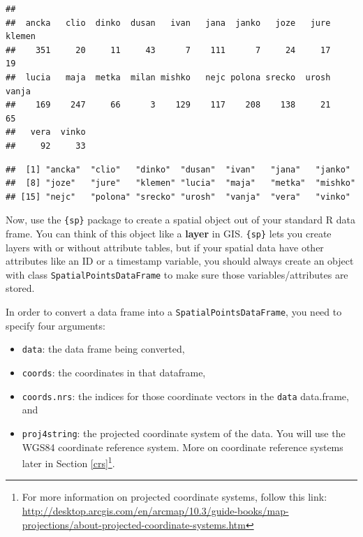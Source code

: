 \documentclass[]{book}
\newenvironment{Shaded}{\begin{snugshade}}{\end{snugshade}}
\newcommand{\KeywordTok}[1]{\textcolor[rgb]{0.13,0.29,0.53}{\textbf{#1}}}
\newcommand{\DecValTok}[1]{\textcolor[rgb]{0.00,0.00,0.81}{#1}}
\newcommand{\StringTok}[1]{\textcolor[rgb]{0.31,0.60,0.02}{#1}}
\newcommand{\CommentTok}[1]{\textcolor[rgb]{0.56,0.35,0.01}{\textit{#1}}}
\newcommand{\OperatorTok}[1]{\textcolor[rgb]{0.81,0.36,0.00}{\textbf{#1}}}
\newcommand{\NormalTok}[1]{#1}
\providecommand{\tightlist}{%
  \setlength{\itemsep}{0pt}\setlength{\parskip}{0pt}}
\let\rmarkdownfootnote\footnote%
\def\footnote{\protect\rmarkdownfootnote}
\theoremstyle{definition}
\theoremstyle{definition}
\theoremstyle{definition}
\theoremstyle{remark}
\begin{document}
\begin{verbatim}
## 
##  ancka   clio  dinko  dusan   ivan   jana  janko   joze   jure klemen 
##    351     20     11     43      7    111      7     24     17     19 
##  lucia   maja  metka  milan mishko   nejc polona srecko  urosh  vanja 
##    169    247     66      3    129    117    208    138     21     65 
##   vera  vinko 
##     92     33
\end{verbatim}

\begin{Shaded}
\end{Shaded}

\begin{verbatim}
##  [1] "ancka"  "clio"   "dinko"  "dusan"  "ivan"   "jana"   "janko" 
##  [8] "joze"   "jure"   "klemen" "lucia"  "maja"   "metka"  "mishko"
## [15] "nejc"   "polona" "srecko" "urosh"  "vanja"  "vera"   "vinko"
\end{verbatim}

Now, use the \texttt{\{sp\}} package \citep{R-sp} to create a spatial
object out of your standard R data frame. You can think of this object
like a \textbf{layer} in GIS. \texttt{\{sp\}} lets you create layers
with or without attribute tables, but if your spatial data have other
attributes like an ID or a timestamp variable, you should always create
an object with class \texttt{SpatialPointsDataFrame} to make sure those
variables/attributes are stored.

In order to convert a data frame into a \texttt{SpatialPointsDataFrame},
you need to specify four arguments:

\begin{itemize}
\tightlist
\item
  \texttt{data}: the data frame being converted,
\item
  \texttt{coords}: the coordinates in that dataframe,
\item
  \texttt{coords.nrs}: the indices for those coordinate vectors in the
  \texttt{data} data.frame, and
\item
  \texttt{proj4string}: the projected coordinate system of the data. You
  will use the WGS84 coordinate reference system. More on coordinate
  reference systems later in Section \ref{crs}\footnote{For more
    information on projected coordinate systems, follow this link:
    \url{http://desktop.arcgis.com/en/arcmap/10.3/guide-books/map-projections/about-projected-coordinate-systems.htm}}.
\end{itemize}
\end{document}
